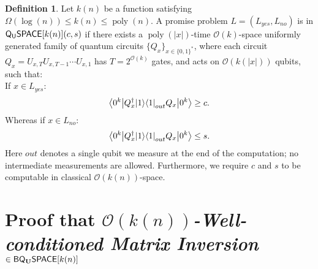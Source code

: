 \documentclass[11pt]{article}
\theoremstyle{definition}
\newtheorem{definition}[theorem]{Definition}
\theoremstyle{remark}
\newcommand\QSPACE{{\sf{Q_{U}SPACE}}}
\newcommand\matrixinvert[1]{{\ensuremath{#1}}\textit{-Well-conditioned Matrix Inversion}}
\newcommand{\classfont}{\sf}
\newcommand{\Unitary}{\mathbf{U}}
\newcommand{\unitaryBQSPACE}[1]{{\classfont{BQ}_\Unitary\classfont{SPACE}}[#1]}
\newcommand\bigoh{\mathcal{O}}
\DeclareMathOperator{\poly}{poly}
\begin{document}
\begingroup
\def\thedefinition{\ref{def: qspace}}
\begin{definition}
Let $k(n)$ be a function satisfying $\Omega(\log(n)) \le k(n) \le \poly(n)$. A promise problem $L=(L_{yes},L_{no})$ is in $\QSPACE[k(n)](c,s)$ if there exists a $\poly(|x|)$-time $\mathcal{O}(k)$-space uniformly generated family of quantum circuits $\{Q_x\}_{x\in\{0,1\}^*}$, where each circuit $Q_x=U_{x,T}U_{x,T-1}\cdots U_{x,1}$ has $T=2^{\mathcal{O}(k)}$ gates, and acts on $\mathcal{O}(k(|x|))$ qubits, such that:\\
 If $x \in L_{yes}$:
\begin{equation}
{\left\langle{0^k}\right\vert} Q^\dagger_x {\left\vert{1}\right\rangle}{\left\langle{1}\right\vert}_{out} Q_x {\left\vert{0^k}\right\rangle} \ge c.
\end{equation}
Whereas if $x \in L_{no}$:
\begin{equation}
{\left\langle{0^k}\right\vert} Q^\dagger_x {\left\vert{1}\right\rangle}{\left\langle{1}\right\vert}_{out} Q_x {\left\vert{0^k}\right\rangle} \le s.
\end{equation}
Here $out$ denotes a single qubit we measure at the end of the computation; no intermediate measurements are allowed.  
Furthermore, we require $c$ and $s$ to be computable in classical $\bigoh(k(n))$-space.
\end{definition}
\addtocounter{theorem}{-1}
\endgroup



\section{Proof that \matrixinvert{\bigoh(k(n))} $\in \unitaryBQSPACE{k(n)}$}\label{app: matrix inversion alg}
\end{document}
